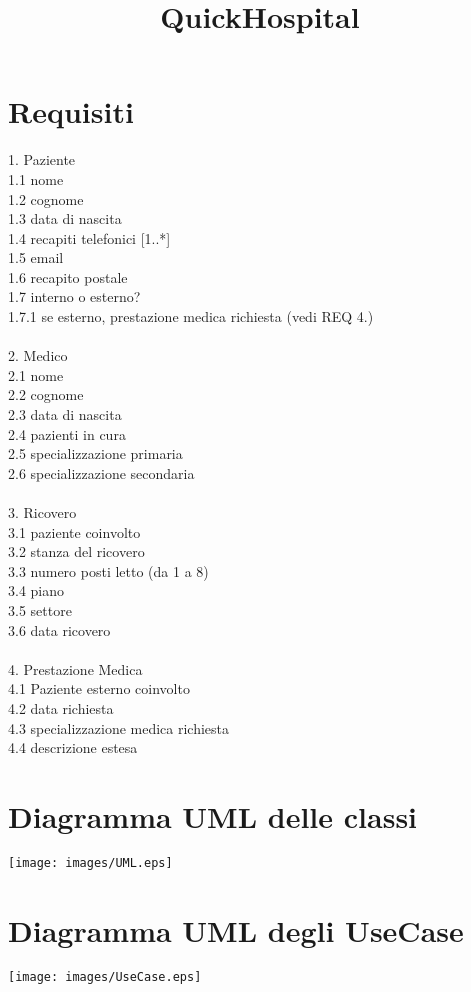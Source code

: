 \documentclass[12pt, letterpaper]{article}
\title{\textbf{QuickHospital}}
\date{}
\newcommand{\acc}{\\\hphantom{}\\}
\newcommand{\id}{{\hphantom{ident}}}
\begin{document}
\maketitle
\section{Requisiti}
1. Paziente \\ 
\id 1.1 nome \\
\id 1.2 cognome \\
\id 1.3 data di nascita \\ 
\id 1.4 recapiti telefonici [1..*] \\ 
\id 1.5 email \\ 
\id 1.6 recapito postale  \\
\id 1.7 interno o esterno? \\ 
\id \id 1.7.1 se esterno, prestazione medica richiesta (vedi REQ 4.)
\acc 
2. Medico \\ 
\id 2.1 nome \\ 
\id 2.2 cognome \\ 
\id 2.3 data di nascita \\ 
\id 2.4 pazienti in cura \\ 
\id 2.5 specializzazione primaria\\
\id 2.6 specializzazione secondaria\acc
3. Ricovero \\ 
\id 3.1 paziente coinvolto \\ 
\id 3.2 stanza del ricovero \\ 
\id \id 3.3 numero posti letto (da 1 a 8)\\
\id \id 3.4 piano \\ 
\id \id 3.5 settore \\ 
\id \id 3.6 data ricovero \acc 
4. Prestazione Medica \\ 
\id 4.1 Paziente esterno coinvolto \\
\id 4.2 data richiesta \\
\id 4.3 specializzazione medica richiesta \\
\id 4.4 descrizione estesa
\newpage 
\section{Diagramma UML delle classi}
\begin{center}
    \texttt{[image: images/UML.eps]}
\end{center}
\newpage 
\section{Diagramma UML degli UseCase}\begin{center}
    \texttt{[image: images/UseCase.eps]}
\end{center}
\end{document}
